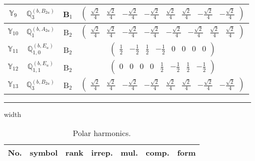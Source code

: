 \documentclass[fleqn,10pt,landscape]{article}
\begin{document}
\begin{itemize}
\begin{center}
\begin{longtable}{c|c|c|c}
$ \mathbb{Y}_{9} $ & $\mathbb{Q}_{3}^{(b,B_{2u})}$ & B$_{1}$ & $\begin{pmatrix} \frac{\sqrt{2}}{4} & \frac{\sqrt{2}}{4} & - \frac{\sqrt{2}}{4} & - \frac{\sqrt{2}}{4} & \frac{\sqrt{2}}{4} & \frac{\sqrt{2}}{4} & - \frac{\sqrt{2}}{4} & - \frac{\sqrt{2}}{4} \end{pmatrix}$ \\ \hline
$ \mathbb{Y}_{10} $ & $\mathbb{Q}_{1}^{(b,A_{2u})}$ & B$_{2}$ & $\begin{pmatrix} \frac{\sqrt{2}}{4} & \frac{\sqrt{2}}{4} & - \frac{\sqrt{2}}{4} & - \frac{\sqrt{2}}{4} & - \frac{\sqrt{2}}{4} & - \frac{\sqrt{2}}{4} & \frac{\sqrt{2}}{4} & \frac{\sqrt{2}}{4} \end{pmatrix}$ \\
$ \mathbb{Y}_{11} $ & $\mathbb{Q}_{1,0}^{(b,E_{u})}$ & B$_{2}$ & $\begin{pmatrix} \frac{1}{2} & - \frac{1}{2} & \frac{1}{2} & - \frac{1}{2} & 0 & 0 & 0 & 0 \end{pmatrix}$ \\
$ \mathbb{Y}_{12} $ & $\mathbb{Q}_{1,1}^{(b,E_{u})}$ & B$_{2}$ & $\begin{pmatrix} 0 & 0 & 0 & 0 & \frac{1}{2} & - \frac{1}{2} & \frac{1}{2} & - \frac{1}{2} \end{pmatrix}$ \\
$ \mathbb{Y}_{13} $ & $\mathbb{Q}_{3}^{(b,B_{2u})}$ & B$_{2}$ & $\begin{pmatrix} \frac{\sqrt{2}}{4} & \frac{\sqrt{2}}{4} & - \frac{\sqrt{2}}{4} & - \frac{\sqrt{2}}{4} & \frac{\sqrt{2}}{4} & \frac{\sqrt{2}}{4} & - \frac{\sqrt{2}}{4} & - \frac{\sqrt{2}}{4} \end{pmatrix}$ \\
\end{longtable}
\end{center}

 \hfil \hrule height 1mm width \textwidth \hfil

\begin{center}
\renewcommand{\arraystretch}{1.3}
\begin{longtable}{ccccccc}
\caption{Polar harmonics.}
 \\
 \hline \hline
No. & symbol & rank & irrep. & mul. & comp. & form \\ \hline \endfirsthead


\end{longtable}
\end{center}
\end{itemize}
\end{document}

